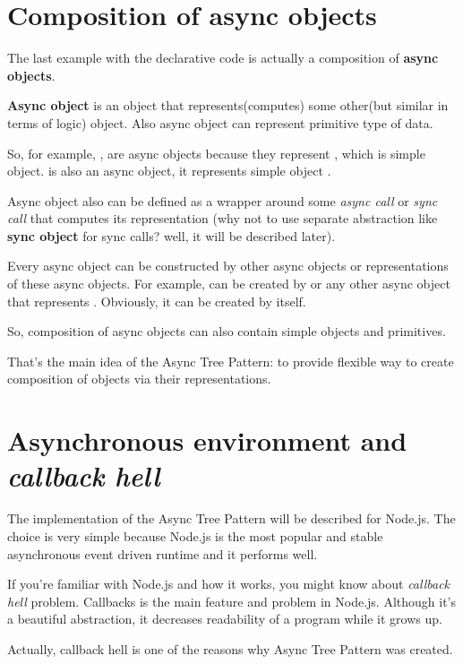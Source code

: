 \documentclass{article}
\begin{document}
\section{Composition of async objects}

The last example with the declarative code is actually a composition of \textbf{async objects}.

\textbf{Async object} is an object that represents(computes) some other(but similar in terms of logic) object. Also async object can represent primitive type of data.

So, for example, ,  are async objects because they represent , which is simple object.  is also an async object, it represents simple object .

Async object also can be defined as a wrapper around some \textit{async call} or \textit{sync call} that computes its representation (why not to use separate abstraction like \textbf{sync object} for sync calls? well, it will be described later).

Every async object can be constructed by other async objects or representations of these async objects. For example,  can be created by  or any other async object that represents . Obviously, it can be created by  itself.

So, composition of async objects can also contain simple objects and primitives.

That's the main idea of the Async Tree Pattern: to provide flexible way to create composition of objects via their representations.

\section{Asynchronous environment and \textit{callback hell}}

The implementation of the Async Tree Pattern will be described for Node.js. The choice is very simple because Node.js is the most popular and stable asynchronous  event driven runtime and it performs well.

If you're familiar with Node.js and how it works, you might know about \textit{callback hell} problem. Callbacks is the main feature and problem in Node.js. Although it's a beautiful abstraction, it decreases readability of a program while it grows up.

Actually, callback hell is one of the reasons why Async Tree Pattern was created.
\end{document}

